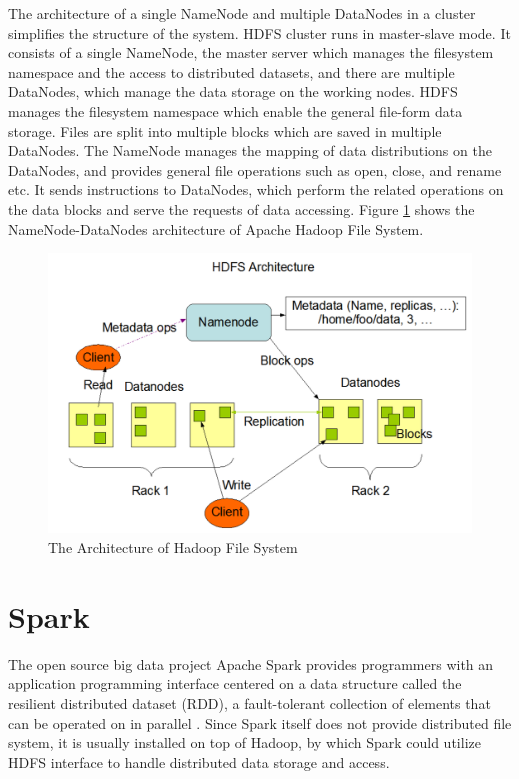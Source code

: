 The architecture of a single NameNode and multiple DataNodes in a cluster simplifies the structure of the system. HDFS cluster runs in master-slave mode.  It consists of a single NameNode, the master server which manages the filesystem namespace and the access to distributed datasets, and there are multiple DataNodes, which manage the data storage on the working nodes. HDFS manages the filesystem namespace which enable the general file-form data storage. Files are split into multiple blocks which are saved in multiple DataNodes. The NameNode manages the mapping of data distributions on the DataNodes, and provides general file operations such as open, close, and rename etc. It sends instructions to DataNodes, which perform the related operations on the data blocks and serve the requests of data accessing. Figure \ref{HDFSArch} shows the NameNode-DataNodes architecture of Apache Hadoop File System.

\begin{figure}[h]
\centering
\includegraphics[scale=0.4]{figures/HDFSArch.png}
\caption{The Architecture of Hadoop File System \cite{ApacheHadoop}}
\label{HDFSArch}
\end{figure}

\section{Spark}

The open source big data project Apache Spark provides programmers with an application programming interface centered on a data structure called the resilient distributed dataset (RDD), a fault-tolerant collection of elements that can be operated on in parallel \cite{ApacheSpark}. Since Spark itself does not provide distributed file system, it is usually installed on top of Hadoop, by which Spark could utilize HDFS interface to handle distributed data storage and access. 

